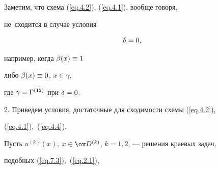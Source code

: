 Заметим, что схема (\ref{eq.4.2}), (\ref{eq.4.1}), вообще говоря,


не~сходится в случае условия


\begin{equation} \label{eq.4.4}


\de=0,


\end{equation}


например, когда $\beta(x)\equiv 1$ 


либо $\beta(x)\equiv 0$, $x\in \gamma$,


где $\gamma=\Gamma^{(12)}$ при $\delta=0$.


\medskip





2. Приведем условия, достаточные для сходимости схемы (\ref{eq.4.2}),


(\ref{eq.4.1}),~(\ref{eq.4.4}).





Пусть $u^{(k)}(x)$, $x\in\od^{(k)}$, $k=1,2$, --- решения краевых задач,


подобных (\ref{eq.7.3}),~(\ref{eq.2.1}),


